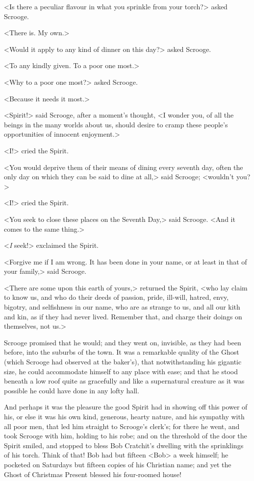 <Is there a peculiar flavour in what you sprinkle from your torch?> asked
Scrooge.

<There is. My own.>

<Would it apply to any kind of dinner on this day?> asked Scrooge.

<To any kindly given. To a poor one most.>

<Why to a poor one most?> asked Scrooge.

<Because it needs it most.>

<Spirit!> said Scrooge, after a moment's thought, <I wonder you, of all the
beings in the many worlds about us, should desire to cramp these people's
opportunities of innocent enjoyment.>

<I\@!> cried the Spirit.

<You would deprive them of their means of dining every seventh day, often the
only day on which they can be said to dine at all,> said Scrooge; <wouldn't
you?>

<I\@!> cried the Spirit.

<You seek to close these places on the Seventh Day,> said Scrooge. <And it comes
to the same thing.>

<\emph{I} seek!> exclaimed the Spirit.

<Forgive me if I am wrong. It has been done in your name, or at least in that of
your family,> said Scrooge.

<There are some upon this earth of yours,> returned the Spirit, <who lay claim
to know us, and who do their deeds of passion, pride, ill-will, hatred, envy,
bigotry, and selfishness in our name, who are as strange to us, and all our kith
and kin, as if they had never lived. Remember that, and charge their doings on
themselves, not us.>

Scrooge promised that he would; and they went on, invisible, as they had been
before, into the suburbs of the town. It was a remarkable quality of the Ghost
(which Scrooge had observed at the baker's), that notwithstanding his gigantic
size, he could accommodate himself to any place with ease; and that he stood
beneath a low roof quite as gracefully and like a supernatural creature as it
was possible he could have done in any lofty hall.

And perhaps it was the pleasure the good Spirit had in showing off this power of
his, or else it was his own kind, generous, hearty nature, and his sympathy with
all poor men, that led him straight to Scrooge's clerk's; for there he went, and
took Scrooge with him, holding to his robe; and on the threshold of the door the
Spirit smiled, and stopped to bless Bob Cratchit's dwelling with the sprinklings
of his torch. Think of that! Bob had but fifteen <Bob> a week himself; he
pocketed on Saturdays but fifteen copies of his Christian name; and yet the
Ghost of Christmas Present blessed his four-roomed house!

